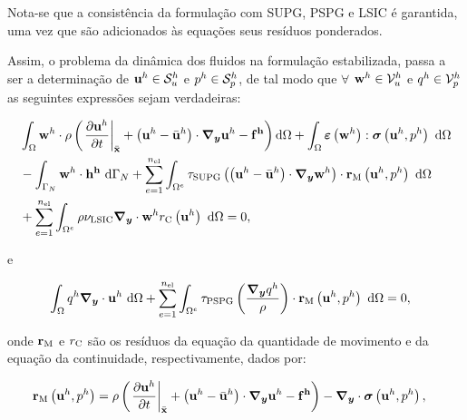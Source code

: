 \documentclass[tese_patricia]{subfiles}%
\begin{document}
Nota-se que a consistência da formulação com SUPG, PSPG e LSIC é garantida, uma vez que são adicionados às equações seus resíduos ponderados. 

Assim, o problema da dinâmica dos fluidos na formulação estabilizada, passa a ser a determinação de $\mathbf{u}^h \in \mathcal{S}_u^h$ e $p^h \in \mathcal{S}_p^h$, de tal modo que $\forall$ $\mathbf{w}^h \in \mathcal{V}_u^h$ e $q^h \in \mathcal{V}_p^h$ as seguintes expressões sejam verdadeiras:

\begin{align}
\begin{split}
&\int_{\Omega} \mathbf{w}^h \cdot \rho\left(\left. \frac{\partial\mathbf{u}^h}{\partial t}\right|_{\bar{\mathbf{x}}}+ \left(\mathbf{u}^h - \bar{\mathbf{u}}^h \right) \cdot \boldsymbol{\nabla_y} \mathbf{u}^h - \mathbf{f^h}\right) \mathrm{d} \Omega +\int_{\Omega} \bm{\varepsilon} \left(\mathbf{w}^h\right) : \boldsymbol{\sigma} \left(\mathbf{u}^h,p^h\right)\ \mathrm{d} \Omega\\ &
- \int_{\Gamma_{N}}\mathbf{w}^h \cdot \mathbf{h^h} \ \mathrm{d} \Gamma_{N} 
+ \sum_{e=1}^{n_{\mathrm{el}}} \int_{\Omega^e} \tau_{\mathrm{SUPG}} \left(\left(\mathbf{u}^h - \bar{\mathbf{u}}^h \right) \cdot \boldsymbol{\nabla_y} \mathbf{w}^h\right) \cdot \mathbf{r}_{\mathrm{M}}\left(\mathbf{u}^h,p^h \right)\  \mathrm{d} \Omega\\
&+ \sum_{e=1}^{n_{\mathrm{el}}} \int_{\Omega^e} \rho \nu_{\mathrm{LSIC}} \boldsymbol{\nabla_y} \cdot \mathbf{w}^h {r}_{\mathrm{C}}\left(\mathbf{u}^h\right)\  \mathrm{d} \Omega = 0,
\label{eq:QM_forma_fraca}
\end{split}
\end{align}

\noindent e

\begin{align}
	\begin{split}
	&\int_{\Omega}q^h \boldsymbol{\nabla_y} \cdot \mathbf{u}^h \ \mathrm{d} \Omega
	+ \sum_{e=1}^{n_{\mathrm{el}}} \int_{\Omega^e} \tau_{\mathrm{PSPG}} \left(\frac{\boldsymbol{\nabla_y} q^h}{\rho}\right) \cdot \mathbf{r}_{\mathrm{M}}\left(\mathbf{u}^h,p^h\right) \  \mathrm{d} \Omega = 0,
	\label{eq:C_forma_fraca}
	\end{split}
	\end{align}

\noindent onde $\mathbf{r}_{\mathrm{M}}$ e ${r}_{\mathrm{C}}$ são os resíduos da equação da quantidade de movimento e da equação da continuidade, respectivamente, dados por:

\begin{align}
\mathbf{r}_{\mathrm{M}}\left(\mathbf{u}^h,p^h\right)&=\rho\left(\left. \frac{\partial\mathbf{u}^h}{\partial t}\right|_{\bar{\mathbf{x}}}+\left(\mathbf{u}^h - \bar{\mathbf{u}}^h \right)\cdot \boldsymbol{\nabla_y} \mathbf{u}^h - \mathbf{f^h}\right) - \boldsymbol{\nabla_y} \cdot \boldsymbol{\sigma}\left(\mathbf{u}^h,p^h\right),
\end{align}
\end{document}
